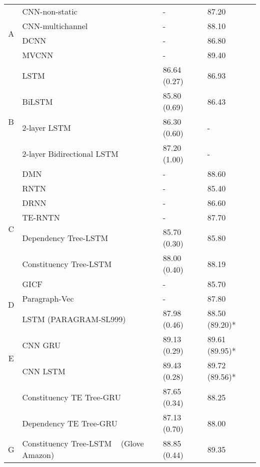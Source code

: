 \begin{table}[H]
\begin{tabular}{c|lll}
    \multirow{4}{*}{A} & CNN-non-static~\cite{KimCNN} & - & 87.20\Tstrut \\
        & CNN-multichannel~\cite{KimCNN} & - & 88.10 \\
    & DCNN~\cite{DCNN} & - & 86.80 \\
    & MVCNN~\cite{2-layer-cnn} & - & 89.40 \\
\hline
        \multirow{5}{*}{B} & LSTM~\cite{originLSTM}    & 86.64 (0.27) & 86.93  \\
        & BiLSTM~\cite{GravesLSTM}  & 85.80 (0.69) & 86.43   \\
        & 2-layer LSTM~\cite{GravesLSTM} & 86.30 (0.60) & - \\
         & 2-layer Bidirectional LSTM~\cite{GravesLSTM} & 87.20 (1.00) & - \\
         & DMN~\cite{attention-gru} & - & 88.60 \\
\hline
        \multirow{5}{*}{C} & RNTN~\cite{socher2013recursive}  & - & 85.40  \\
        & DRNN~\cite{IrsoyDRNN} & - & 86.60 \\
        & TE-RNTN~\cite{tag-embedding-rnn} & - & 87.70 \\
        & Dependency Tree-LSTM  ~\cite{treeLSTM}  & 85.70 (0.30)  & 85.80 \\
         & Constituency Tree-LSTM ~\cite{treeLSTM} & 88.00 (0.40)    &   88.19\\
\hline
        \multirow{3}{*}{D} & GICF~\cite{group-instance} & - & 85.70 \\
         & Paragraph-Vec~\cite{ParagraphVec} & - & 87.80 \\
         & LSTM (PARAGRAM-SL999)~\cite{wieting2015towards} & 87.98 (0.46) & 88.50 (89.20)*
          \\
\hline
         \multirow{2}{*}{E}  & CNN GRU ~\cite{cnn-rnn}                    & 89.13 (0.29)  &  89.61 (89.95)*    \\
         & CNN LSTM ~\cite{cnn-rnn}                    & 89.43 (0.28)  & 89.72 (89.56)*\Bstrut    \\
\Xhline{3\arrayrulewidth}
\Xhline{3\arrayrulewidth}
         \multirow{2}{*}{F} & Constituency TE Tree-GRU                 & 87.65 (0.34) & 88.25\Tstrut \\
          & Dependency TE Tree-GRU                   & 87.13 (0.70)  & 88.00\Bstrut \\
\hline
\hline
        \multirow{1}{*}{G} & Constituency Tree-LSTM ~\cite{treeLSTM} (Glove Amazon) & 88.85 (0.44) & 89.35\Tstrut\Bstrut \\

\end{tabular}
\end{table}
